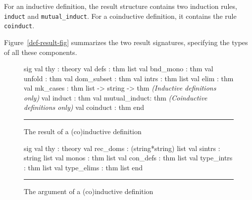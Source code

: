 For an inductive definition, the result structure contains two induction rules,
{\tt induct} and \verb|mutual_induct|.  For a coinductive definition, it
contains the rule \verb|coinduct|.

Figure~\ref{def-result-fig} summarizes the two result signatures,
specifying the types of all these components.

\begin{figure}
\begin{ttbox}
sig
val thy          : theory
val defs         : thm list
val bnd_mono     : thm
val unfold       : thm
val dom_subset   : thm
val intrs        : thm list
val elim         : thm
val mk_cases     : thm list -> string -> thm
{\it(Inductive definitions only)} 
val induct       : thm
val mutual_induct: thm
{\it(Coinductive definitions only)}
val coinduct    : thm
end
\end{ttbox}
\hrule
\caption{The result of a (co)inductive definition} \label{def-result-fig}

\medskip
\begin{ttbox}
sig  
val thy          : theory
val rec_doms     : (string*string) list
val sintrs       : string list
val monos        : thm list
val con_defs     : thm list
val type_intrs   : thm list
val type_elims   : thm list
end
\end{ttbox}
\hrule
\caption{The argument of a (co)inductive definition} \label{def-arg-fig}
\end{figure}

